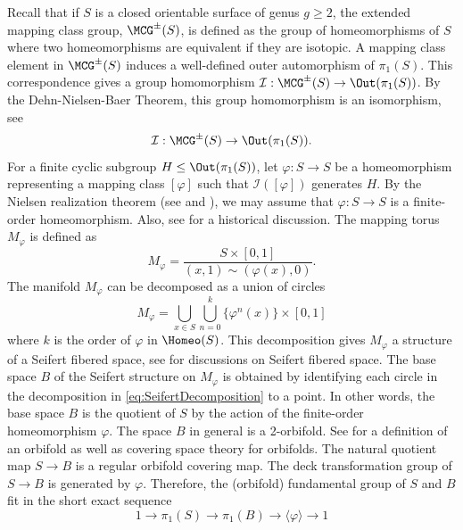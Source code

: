 \documentclass{amsart}
\begin{document}
Recall that if $S$ is a closed orientable surface of genus $g \geq 2$, the extended mapping class group, $\MCG^{\pm}(S)$, is defined as the group of homeomorphisms of $S$ where two homeomorphisms are equivalent if they are isotopic. A mapping class element in $\MCG^{\pm}(S)$ induces a well-defined outer automorphism of $\pi_1(S)$. This correspondence gives a group homomorphism $\mathcal{I}:\MCG^{\pm}(S) \to \Out(\pi_1(S))$. By the Dehn-Nielsen-Baer Theorem, this group homomorphism is an isomorphism, see \cite[Chapter 8]{farbmargalit2012primer}
\begin{equation}
\label{eq:DehnNielsenBaerTheorem}
\mathcal{I}: \MCG^{\pm}(S) \to \Out(\pi_1(S)).
\end{equation}
For a finite cyclic subgroup $H \leq \Out(\pi_1(S))$, let $\varphi:S\to S$ be a homeomorphism representing a mapping class $[\varphi]$ such that $\mathcal{I}([\varphi])$ generates $H$. By the Nielsen realization theorem (see \cite{nielsen1943realization} and \cite[Theorem 5]{kerckhoff1983nielsenrealization}), we may assume that $\varphi:S\to S$ is a finite-order homeomorphism.  Also, see \cite[Chapter 7]{farbmargalit2012primer} for a historical discussion. The mapping torus $M_\varphi$ is defined as
\[
M_\varphi = \frac{S\times[0,1]}{(x,1) \sim (\varphi(x),0)}.
\]
The manifold $M_\varphi$ can be decomposed as a union of circles
\begin{equation}
\label{eq:SeifertDecomposition}
M_\varphi = \bigcup_{x \in S} \bigcup_{n=0}^{k} \{\varphi^n(x) \}\times[0,1]
\end{equation} 
where $k$ is the order of $\varphi$ in $\Homeo(S)$. This decomposition gives $M_\varphi$ a structure of a Seifert fibered space, see \cite[Section 3]{scott8geometries} for discussions on Seifert fibered space. The base space $B$ of the Seifert structure on $M_\varphi$ is obtained by identifying each circle in the decomposition in \cref{eq:SeifertDecomposition} to a point. In other words, the base space $B$ is the quotient of $S$ by the action of the finite-order homeomorphism $\varphi$. The space $B$ in general is a 2-orbifold. See \cite[Section 2]{scott8geometries} for a definition of an orbifold as well as covering space theory for orbifolds. The natural quotient map $S \to B$ is a regular orbifold covering map. The deck transformation group of $S\to B$ is generated by $\varphi$. Therefore, the (orbifold) fundamental group of $S$ and $B$ fit in the short exact sequence 
\begin{equation}
\label{eq:SESofBasespace}
1 \to \pi_1(S) \to \pi_1(B) \to \langle \varphi \rangle \to 1 
\end{equation}
\end{document}
